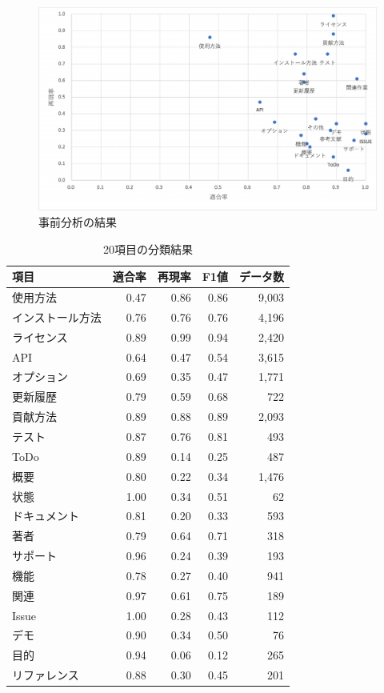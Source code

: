 \documentclass[submit]{ipsj}
\begin{document}
\begin{figure}[t]
 	\centering
		\includegraphics[width=1.0\linewidth]{./IPSJ202303_Ishioka/maluti_PR.pdf}
	\caption{事前分析の結果}
	\label{fig:oss_development}
\end{figure}



\begin{table}[t]
\centering
\caption{20項目の分類結果}
\label{tab:data}
\begin{tabular}{l|r|r|r|r}
\hline\hline
項目 & 適合率 & 再現率 & F1値 & データ数 \\
\hline
使用方法 & 0.47 & 0.86 & 0.86 & 9,003 \\\hline
インストール方法 & 0.76 & 0.76 & 0.76 & 4,196 \\\hline
ライセンス & 0.89 & 0.99 & 0.94 & 2,420 \\\hline
API & 0.64 & 0.47 & 0.54 & 3,615 \\\hline
オプション & 0.69 & 0.35 & 0.47 & 1,771 \\\hline
更新履歴 & 0.79 & 0.59 & 0.68 & 722 \\\hline
貢献方法 & 0.89 & 0.88 & 0.89 & 2,093 \\\hline
テスト & 0.87 & 0.76 & 0.81 & 493 \\\hline
ToDo & 0.89 & 0.14 & 0.25 & 487 \\\hline
概要 & 0.80 & 0.22 & 0.34 & 1,476 \\\hline
状態 & 1.00 & 0.34 & 0.51 & 62 \\\hline
ドキュメント & 0.81 & 0.20 & 0.33 & 593 \\\hline
著者 & 0.79 & 0.64 & 0.71 & 318 \\\hline
サポート & 0.96 & 0.24 & 0.39 & 193 \\\hline
機能 & 0.78 & 0.27 & 0.40 & 941 \\\hline
関連 & 0.97 & 0.61 & 0.75 & 189 \\\hline
Issue & 1.00 & 0.28 & 0.43 & 112 \\\hline
デモ & 0.90 & 0.34 & 0.50 & 76 \\\hline
目的 & 0.94 & 0.06 & 0.12 & 265 \\\hline
リファレンス & 0.88 & 0.30 & 0.45 & 201 \\
\hline
\end{tabular}
\end{table}
\end{document}
